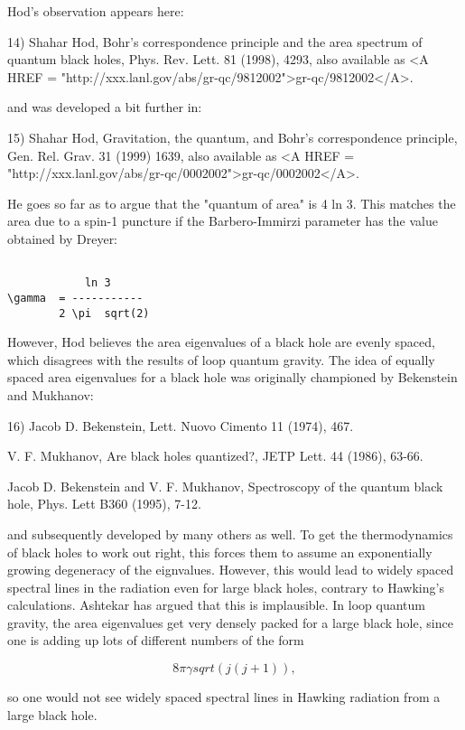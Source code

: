 Hod's observation appears here:

14) Shahar Hod, Bohr's correspondence principle and the area spectrum 
of quantum black holes, Phys. Rev. Lett. 81 (1998), 4293, also available 
as <A HREF = "http://xxx.lanl.gov/abs/gr-qc/9812002">gr-qc/9812002</A>.

and was developed a bit further in:

15) Shahar Hod, Gravitation, the quantum, and Bohr's correspondence
principle, Gen. Rel. Grav. 31 (1999) 1639, also available as <A HREF = "http://xxx.lanl.gov/abs/gr-qc/0002002">gr-qc/0002002</A>.

He goes so far as to argue that the "quantum of area" is 4 ln 3.
This matches the area due to a spin-1 puncture if the Barbero-Immirzi
parameter has the value obtained by Dreyer:


\begin{verbatim}

            ln 3
\gamma  = -----------
        2 \pi  sqrt(2)
\end{verbatim}
    
However, Hod believes the area eigenvalues of a black hole are evenly
spaced, which disagrees with the results of loop quantum gravity.  The
idea of equally spaced area eigenvalues for a black hole was originally
championed by Bekenstein and Mukhanov:

16) Jacob D. Bekenstein, Lett. Nuovo Cimento 11 (1974), 467.

V. F. Mukhanov, Are black holes quantized?, JETP Lett. 44 (1986), 63-66.

Jacob D. Bekenstein and V. F. Mukhanov, Spectroscopy of the quantum
black hole, Phys. Lett B360 (1995), 7-12.

and subsequently developed by many others as well.  To get the
thermodynamics of black holes to work out right, this forces them to
assume an exponentially growing degeneracy of the eignvalues.  However,
this would lead to widely spaced spectral lines in the radiation even
for large black holes, contrary to Hawking's calculations.  Ashtekar has
argued that this is implausible.  In loop quantum gravity, the area
eigenvalues get very densely packed for a large black hole, since one is
adding up lots of different numbers of the form


$$

8 \pi  \gamma  sqrt(j(j+1)), 
$$
    
so one would not see widely spaced spectral lines in Hawking
radiation from a large black hole.  

